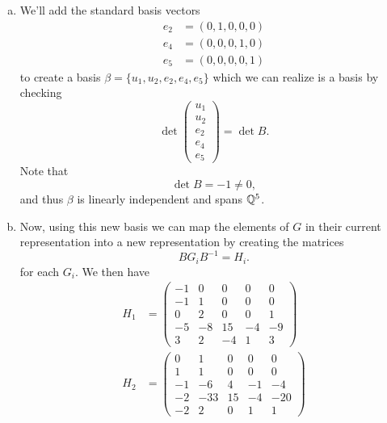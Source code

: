 \documentclass[leqno]{article}
\begin{document}
\begin{solution}
\begin{enumerate}[(a)]
    \item We'll add the standard basis vectors
    \begin{align*}
        e_2 &= (0,1,0,0,0)\\
        e_4 &= (0,0,0,1,0)\\
        e_5 &= (0,0,0,0,1)
    \end{align*}
    to create a basis $\beta = \{u_1,u_2,e_2,e_4,e_5\}$ which we can realize is a basis by checking
    \[
    \det \begin{pmatrix}
    u_1\\
    u_2\\
    e_2\\
    e_4\\
    e_5
    \end{pmatrix} = \det B.
    \]
    Note that 
    \[
    \det B = -1 \neq 0,
    \]
    and thus $\beta$ is linearly independent and spans $\mathbb{Q}^5$.  
    
    \item Now, using this new basis we can map the elements of $G$ in their current representation into a new representation by creating the matrices
    \[
    BG_iB^{-1} = H_i.
    \]
    for each $G_i$.  We then have
    \begin{align*}
        H_1 &= \left(\begin{array}{cc|ccc}
        -1 & 0 & 0 & 0 & 0\\
        -1 & 1 & 0 & 0 & 0\\
        \hline
        0 & 2 & 0 & 0 & 1\\
        -5 & -8 & 15 & -4 & -9\\
        3 & 2 & -4 & 1 & 3
        \end{array}\right)\\
        H_2 &= \left(\begin{array}{cc|ccc}
        0 & 1 & 0 & 0 & 0\\
        1 & 1 & 0 & 0 & 0\\
        \hline
        -1 & -6 & 4 & -1 & -4\\
        -2 & -33 & 15 & -4 & -20\\
        -2 & 2 & 0 & 1 & 1
        \end{array}\right)
    \end{align*}
    

\end{enumerate}
\end{solution}
\end{document}
